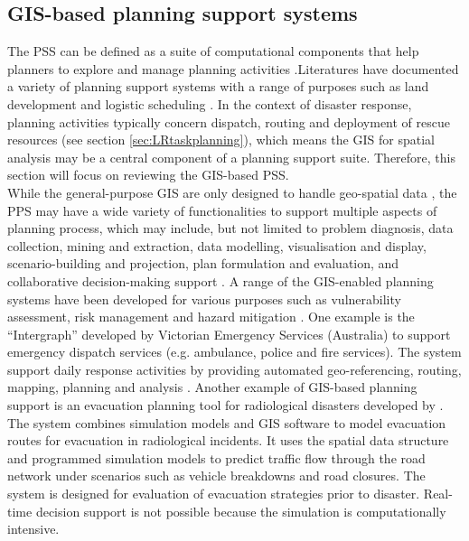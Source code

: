 \subsection{GIS-based planning support systems}
The \acf{PSS} can be defined as a suite of computational components that help planners to explore and manage planning activities \cite{Geertman2004}.Literatures have documented a variety of planning support systems with a range of purposes such as land development \cite{Pettit2003}  and logistic scheduling \cite{Miller}. In the context of disaster response, planning activities  typically concern dispatch, routing and deployment of rescue resources (see section \ref{sec:LRtaskplanning}), which means the \ac{GIS} for spatial analysis may be a central component of a planning support suite. Therefore, this section will focus on reviewing the \ac{GIS}-based \ac{PSS}. \\

While the general-purpose \ac{GIS}  are only designed to handle geo-spatial data \cite{Geertman2004}, the PPS may have a wide variety of functionalities to support multiple aspects of planning process, which may include, but not limited to problem diagnosis, data collection, mining and extraction, data modelling, visualisation and display, scenario-building and projection, plan formulation and evaluation, and collaborative decision-making support \cite{Geertman2004,Zerger2003}. A range of the \ac{GIS}-enabled planning systems have been developed for various purposes such as vulnerability assessment, risk management and hazard mitigation \cite{Cova199,Schooley2010}. One example is the ``Intergraph'' developed by Victorian Emergency Services (Australia) \cite{IntergraphCorporation2000} to support emergency dispatch services (e.g. ambulance, police and fire services). The system support daily response activities by providing automated geo-referencing, routing, mapping, planning and analysis \cite{Zerger2003}. Another example of \ac{GIS}-based planning support is an evacuation planning tool for radiological disasters developed by \cite{Eglese1994}. The system combines simulation models and  \ac{GIS} software to model evacuation routes for evacuation in radiological incidents.  It uses the spatial data structure and programmed simulation models to predict traffic flow through the road network under scenarios such as vehicle breakdowns and road closures. The system is designed for evaluation of evacuation strategies prior to disaster. Real-time decision support is not possible because the simulation is computationally intensive.\\

